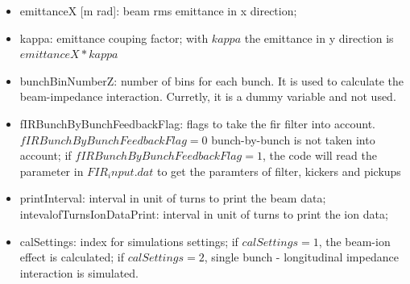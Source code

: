 \documentclass[aps,prab,reprint,superscriptaddress,showpacs,showkeys,letter]{revtex4-1}
\begin{document}
\begin{itemize}
\item  emittanceX [m rad]: beam rms emittance in x direction;
\item kappa: emittance couping factor; with $kappa$ the emittance in y direction is $emittanceX*kappa$
\item bunchBinNumberZ: number of bins for each bunch. It is used to calculate the beam-impedance interaction. Curretly, it is a dummy variable and not used. 
\item fIRBunchByBunchFeedbackFlag: flags to take the fir filter into account. $fIRBunchByBunchFeedbackFlag=0$ bunch-by-bunch is not taken into account; if $fIRBunchByBunchFeedbackFlag=1$, the code will read the parameter in $FIR_input.dat$ to get the paramters of filter, kickers and pickups
\item printInterval: interval in unit of turns to print the beam data;
\itme intevalofTurnsIonDataPrint: interval in unit of turns to print the ion data;
\item calSettings: index for simulations settings; if  $calSettings=1$, the beam-ion effect is calculated;  if  $calSettings=2$, single bunch - longitudinal impedance interaction is simulated.
\end{itemize}


\end{document}
